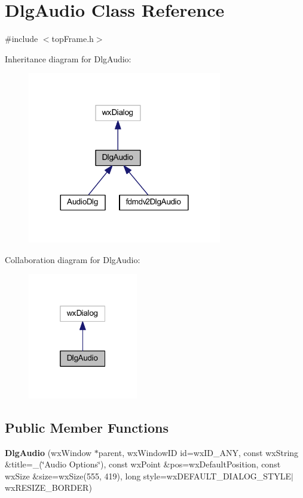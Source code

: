 \hypertarget{class_dlg_audio}{\section{Dlg\-Audio Class Reference}
\label{class_dlg_audio}
}


{\ttfamily \#include $<$top\-Frame.\-h$>$}



Inheritance diagram for Dlg\-Audio\-:
\nopagebreak
\begin{figure}[H]
\begin{center}
\leavevmode
\includegraphics[width=240pt]{class_dlg_audio__inherit__graph}
\end{center}
\end{figure}


Collaboration diagram for Dlg\-Audio\-:
\nopagebreak
\begin{figure}[H]
\begin{center}
\leavevmode
\includegraphics[width=136pt]{class_dlg_audio__coll__graph}
\end{center}
\end{figure}
\subsection*{Public Member Functions}
\begin{DoxyCompactItemize}
\item 
\hypertarget{class_dlg_audio_a95fa3d4e8550bf2a16b8562c9c518eae}{{\bfseries Dlg\-Audio} (wx\-Window $\ast$parent, wx\-Window\-I\-D id=wx\-I\-D\-\_\-\-A\-N\-Y, const wx\-String \&title=\-\_\-(\char`\"{}Audio Options\char`\"{}), const wx\-Point \&pos=wx\-Default\-Position, const wx\-Size \&size=wx\-Size(555, 419), long style=wx\-D\-E\-F\-A\-U\-L\-T\-\_\-\-D\-I\-A\-L\-O\-G\-\_\-\-S\-T\-Y\-L\-E$|$wx\-R\-E\-S\-I\-Z\-E\-\_\-\-B\-O\-R\-D\-E\-R)}\label{class_dlg_audio_a95fa3d4e8550bf2a16b8562c9c518eae}

\end{DoxyCompactItemize}

